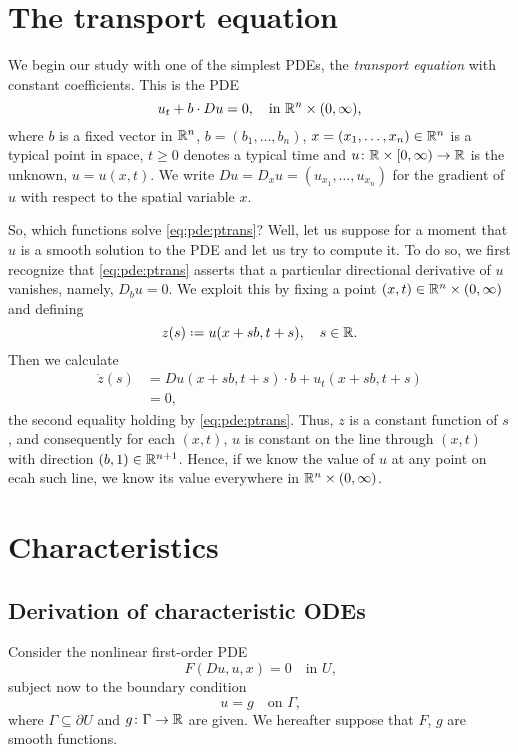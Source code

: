 \section{The transport equation}
We begin our study with one of the simplest PDEs, the \emph{transport
  equation} with constant coefficients. This is the PDE
\begin{equation}
  \label{eq:pde:ptrans}
  u_t+b\cdot Du=0,\quad \text{in \(\mathbb{R}^n\times(0,\infty)\),}
\end{equation}
where \(b\) is a fixed vector in \(\mathbb{R}^n\), \(b=(b_1,\dotsc,b_n)\),
\(x=(x_1,\dotsc,x_n)\in\mathbb{R}^n\) is a typical point in space, \(t\geq 0\)
denotes a typical time and \(u\colon\mathbb{R}\times[0,\infty)\to\mathbb{R}\) is the
unknown, \(u=u(x,t)\). We write \(Du=D_xu=(u_{x_1},\dotsc,u_{x_n})\) for
the gradient of \(u\) with respect to the spatial variable \(x\).

So, which functions solve \eqref{eq:pde:ptrans}? Well, let us suppose for a
moment that \(u\) is a smooth solution to the PDE and let us try to compute
it. To do so, we first recognize that \eqref{eq:pde:ptrans} asserts that a
particular directional derivative of \(u\) vanishes, namely, \(D_bu=0\). We
exploit this by fixing a point \((x,t)\in\mathbb{R}^n\times(0,\infty)\) and
defining
\[
  z(s)\defeq u(x+sb,t+s),\quad s\in\bbR.
\]
Then we calculate
\begin{align*}
  \dot z(s)&=Du(x+sb,t+s)\cdot b+u_t(x+sb,t+s)\\
           &=0,
\end{align*}
the second equality holding by \eqref{eq:pde:ptrans}. Thus, \(z\) is a
constant function of \(s\), and consequently for each \((x,t)\), \(u\) is
constant on the line through \((x,t)\) with direction
\((b,1)\in\mathbb{R}^{n+1}\). Hence, if we know the value of \(u\) at any point
on ecah such line, we know its value everywhere in
\(\mathbb{R}^n\times(0,\infty)\).

\section{Characteristics}
\subsection{Derivation of characteristic ODEs}
Consider the nonlinear first-order PDE
\begin{equation}
  \label{eq:pde:pde-1}
  F(Du,u,x)=0\quad\text{in \(U\),}
\end{equation}
subject now to the boundary condition
\begin{equation}
  \label{eq:pde:initial-cond-1}
  u=g\quad\text{on \(\Gamma\),}
\end{equation}
where \(\Gamma\subseteq\partial U\) and \(g\colon\Gamma\to\mathbb{R}\) are
given. We hereafter suppose that \(F\), \(g\) are smooth functions.

